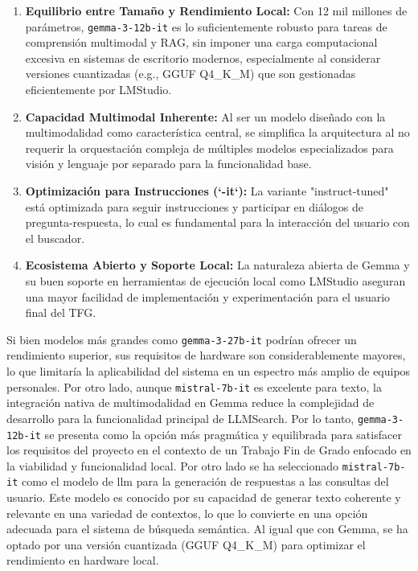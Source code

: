 \begin{enumerate}
    \item \textbf{Equilibrio entre Tamaño y Rendimiento Local:} Con 12 mil millones de parámetros, \texttt{gemma-3-12b-it} es lo suficientemente robusto para tareas de comprensión multimodal y RAG, sin imponer una carga computacional excesiva en sistemas de escritorio modernos, especialmente al considerar versiones cuantizadas (e.g., GGUF Q4\_K\_M) que son gestionadas eficientemente por LMStudio.
    \item \textbf{Capacidad Multimodal Inherente:} Al ser un modelo diseñado con la multimodalidad como característica central, se simplifica la arquitectura al no requerir la orquestación compleja de múltiples modelos especializados para visión y lenguaje por separado para la funcionalidad base.
    \item \textbf{Optimización para Instrucciones (`-it`):} La variante "instruct-tuned" está optimizada para seguir instrucciones y participar en diálogos de pregunta-respuesta, lo cual es fundamental para la interacción del usuario con el buscador.
    \item \textbf{Ecosistema Abierto y Soporte Local:} La naturaleza abierta de Gemma y su buen soporte en herramientas de ejecución local como LMStudio aseguran una mayor facilidad de implementación y experimentación para el usuario final del TFG.
\end{enumerate}

Si bien modelos más grandes como \texttt{gemma-3-27b-it} podrían ofrecer un rendimiento superior, sus requisitos de hardware son considerablemente mayores, lo que limitaría la aplicabilidad del sistema en un espectro más amplio de equipos personales. Por otro lado, aunque \texttt{mistral-7b-it} es excelente para texto, la integración nativa de multimodalidad en Gemma reduce la complejidad de desarrollo para la funcionalidad principal de LLMSearch. Por lo tanto, \texttt{gemma-3-12b-it} se presenta como la opción más pragmática y equilibrada para satisfacer los requisitos del proyecto en el contexto de un Trabajo Fin de Grado enfocado en la viabilidad y funcionalidad local.
Por otro lado se ha seleccionado \texttt{mistral-7b-it} como el modelo de \gls{llm} para la generación de respuestas a las consultas del usuario. Este modelo es conocido por su capacidad de generar texto coherente y relevante en una variedad de contextos, lo que lo convierte en una opción adecuada para el sistema de búsqueda semántica. Al igual que con Gemma, se ha optado por una versión cuantizada (GGUF Q4\_K\_M) para optimizar el rendimiento en hardware local.

